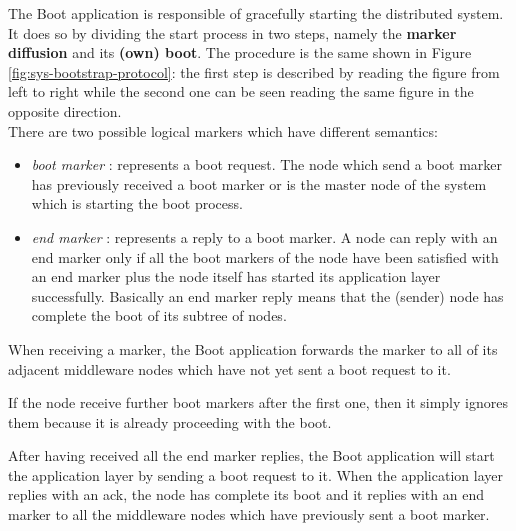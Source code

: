 \label{sec:mw-boot-descr}

The Boot application is responsible
of gracefully starting the distributed
system.
It does so by dividing the start process in two steps, namely the
\textbf{marker diffusion} and its \textbf{(own) boot}. The procedure is
the same shown in Figure \ref{fig:sys-bootstrap-protocol}: the first step
is described by reading the figure from left to right
while the second one can be seen reading the same figure
in the opposite direction.
\\

There are two possible logical markers which have different semantics:
\begin{itemize}
	\item \textit{boot marker} : represents a boot request. The node which send
	a boot marker has previously received a boot marker or
	is the master node of the system which is starting the boot process.
	\item \textit{end marker} : represents a reply to a boot marker. A node
	can reply with an end marker only if all the boot markers of the node have
	been satisfied with an end marker plus the node itself has started its
	application layer successfully. Basically an end marker reply
	means that the (sender) node
	has complete the boot of its subtree of nodes.
\end{itemize}

When receiving a marker, the Boot application forwards the marker to all
of its adjacent middleware nodes which have not yet sent a boot request to it.

If the node receive further boot markers after the first one, then it simply
ignores them because it is already proceeding with the boot.

After having received all the end marker replies,
the Boot application will start the application layer
by sending a boot request to it.
When the application layer replies with an ack, the node has complete its boot
and it replies with an end marker to all the middleware nodes which have
previously sent a boot marker.
